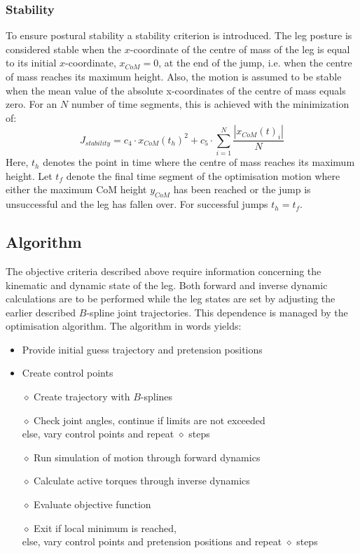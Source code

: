 \documentclass[letterpaper, 10 pt, conference]{ieeeconf}  %
\begin{document}
\subsubsection{Stability}
To ensure postural stability a stability criterion is introduced. The leg posture is considered stable when the $x$-coordinate of the centre of mass of the leg is equal to its initial $x$-coordinate, $x_{CoM}=0$, at the end of the jump, i.e. when the centre of mass reaches its maximum height. Also, the motion is assumed to be stable when the mean value of the absolute x-coordinates of the centre of mass equals zero. For an $N$ number of time segments, this is achieved with the minimization of:
 \begin{equation}
J_{stability}  = c_4\cdot x_{CoM}(t_h)^2 + c_5\cdot  \sum^{N}_{i=1}\frac{| x_{CoM}(t)_i |}{N}
 \end{equation}
Here, $t_h$ denotes the point in time where the centre of mass reaches its maximum height. Let $t_f$ denote the final time segment of the optimisation motion where either the maximum CoM height $y_{CoM}$ has been reached or the jump is unsuccessful and the leg has fallen over. For successful jumps $t_h=t_f$. \\

\subsection{Algorithm}

The objective criteria described above require information concerning the kinematic and dynamic state of the leg. Both forward and inverse dynamic calculations are to be performed while the leg states are set by adjusting the earlier described $B$-spline joint trajectories. This dependence is managed by the optimisation algorithm. The algorithm in words yields:\\

\begin{itemize}
	\item Provide initial guess trajectory and pretension positions
	\item Create control points\\
	\item[$\diamond$] Create trajectory with $B$-splines
	\item[$\diamond$] Check joint angles, continue if limits are not exceeded \\else, vary control points and repeat $\diamond$ steps
	\item[$\diamond$] Run simulation of motion through forward dynamics
	\item[$\diamond$] Calculate active torques through inverse dynamics
	\item[$\diamond$] Evaluate objective function\\
	\item[$\diamond$] Exit if local minimum is reached, \\ else, vary control points and pretension positions and repeat $\diamond$ steps
\end{itemize}
\end{document}
